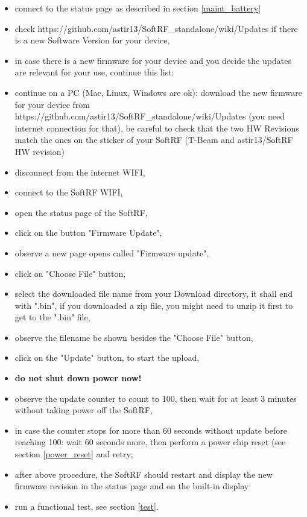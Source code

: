 \documentclass[10pt,a4paper]{article}
\begin{document}
\begin{itemize}
\item connect to the status page as described in section \ref{maint_battery}
\item check https://github.com/astir13/SoftRF\_standalone/wiki/Updates if there is a new Software Version for your device,
\item in case there is a new firmware for your device and you decide the updates are relevant for your use, continue this list:
\item continue on a PC (Mac, Linux, Windows are ok): download the new firmware for your device from https://github.com/astir13/SoftRF\_standalone/wiki/Updates (you need internet connection for that), be careful to check that the two HW Revisions match the ones on the sticker of your SoftRF (T-Beam and astir13/SoftRF HW revision)
\item disconnect from the internet WIFI,
\item connect to the SoftRF WIFI,
\item open the status page of the SoftRF,
\item click on the button "Firmware Update",
\item observe a new page opens called "Firmware update",
\item click on "Choose File" button,
\item select the downloaded file name from your Download directory, it shall end with ".bin", if you downloaded a zip file, you might need to unzip it first to get to the ".bin" file,
\item observe the filename be shown besides the "Choose File" button,
\item click on the "Update" button, to start the upload,
\item {\bf do not shut down power now!}
\item observe the update counter to count to 100, then wait for at least 3 minutes without taking power off the SoftRF,
\item in case the counter stops for more than 60 seconds without update before reaching 100: wait 60 seconds more, then perform a power chip reset (see section \ref{power_reset} and retry;
\item after above procedure, the SoftRF should restart and display the new firmware revision in the status page and on the built-in display
\item run a functional test, see section \ref{test}.

\end{itemize}
\end{document}
